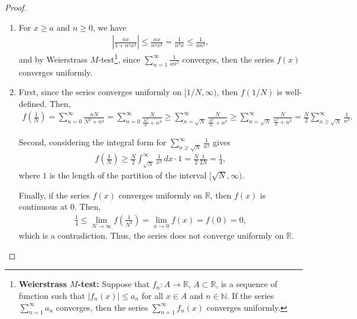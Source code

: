 \documentclass[11pt]{article}
\theoremstyle{definition}
\numberwithin{equation}{subsection}
\begin{document}
\begin{proof}
~\begin{enumerate}[label=(\alph*)]
    \item For $x \geq a$ and $n \geq 0$, we have
    \begin{align*}
        \left|\frac{nx}{1 + n^4x^2}\right| \leq \frac{nx}{n^4x^2} = \frac{1}{n^3x} \leq \frac{1}{an^3},
    \end{align*}
    and by Weierstrass $M$-test\footnote{{\bf Weierstrass $M$-test:} Suppose that $f_n: A \to \mathbb{R}$, $A \subset \mathbb{R}$, is a sequence of function such that $|f_n(x)| \leq a_n$ for all $x \in A$ and $n \in \mathbb{N}$. If the series $\displaystyle \sum^\infty_{n=1}a_n$ converges, then the series $\displaystyle \sum^\infty_{n=1}f_n(x)$ converges uniformly.}, since $\displaystyle \sum^\infty_{n=1} \frac{1}{an^3}$ converges, then the series $f(x)$ converges uniformly.
    
    \item First, since the series converges uniformly on $[1/N, \infty)$, then $f(1/N)$ is well-defined. Then,
    \begin{align*}
        f\left(\frac{1}{N}\right) = \sum^\infty_{n=0} \frac{nN}{N^2 + n^4} = \sum^\infty_{n=0} \frac{N}{\frac{N^2}{n} + n^3} \geq \sum^\infty_{n=\sqrt{N}} \frac{N}{\frac{N^2}{n} + n^3} \geq \sum^\infty_{n=\sqrt{N}} \frac{N}{\frac{n^4}{n} + n^3} = \frac{N}{2} \sum^\infty_{n\geq \sqrt{N}} \frac{1}{n^3}.
    \end{align*}
    
    Second, considering the integral form for $\displaystyle \sum^\infty_{n\geq \sqrt{N}} \frac{1}{n^3}$ gives
    \begin{align*}
        f\left(\frac{1}{N}\right) \geq \frac{N}{2} \int^\infty_{\sqrt{N}} \frac{1}{x^3}\, dx \cdot 1 = \frac{N}{2} \frac{1}{2N} = \frac{1}{4},
    \end{align*}
    where $1$ is the length of the partition of the interval $[\sqrt{N}, \infty)$. 
    
    Finally, if the series $f(x)$ converges uniformly on $\mathbb{R}$, then $f(x)$ is continuous at $0$. Then,
    \begin{align*}
        \frac{1}{4} \leq \lim_{N \to \infty} f\left(\frac{1}{N^2}\right) = \lim_{x\to 0} f(x) = f(0) = 0,
    \end{align*}
    which is a contradiction. Thus, the series does not converge uniformly on $\mathbb{R}$.
\end{enumerate}
\end{proof}
\end{document}
